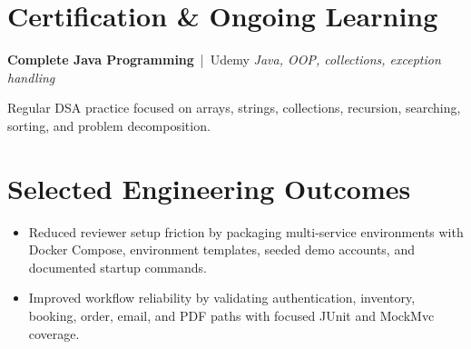 \documentclass[a4paper,10pt]{article}
\newcommand{\resumeItem}[1]{\item \small{#1}}
\begin{document}
\section*{Certification \& Ongoing Learning}
\small \textbf{Complete Java Programming} \,|\, Udemy \hfill \textit{\small Java, OOP, collections, exception handling}

\vspace{4pt}
\small Regular DSA practice focused on arrays, strings, collections, recursion, searching, sorting, and problem decomposition.

\section*{Selected Engineering Outcomes}
\begin{itemize}
  \resumeItem{Reduced reviewer setup friction by packaging multi-service environments with Docker Compose, environment templates, seeded demo accounts, and documented startup commands.}
  \resumeItem{Improved workflow reliability by validating authentication, inventory, booking, order, email, and PDF paths with focused JUnit and MockMvc coverage.}
\end{itemize}
\end{document}
